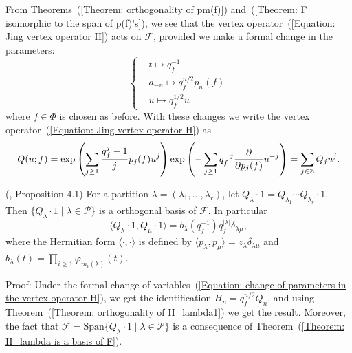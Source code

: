 From Theorems~(\ref{Theorem: orthogonality of pm(f)}) and~(\ref{Theorem: F isomorphic to the span of p(f)'s}), we see that the vertex operator~(\ref{Equation: Jing vertex operator H}) acts on $\mathcal{F}$, provided we make a formal change in the parameters:
\begin{equation}\label{Equation: change of parameters in the vertex operator H}
    \left\{\begin{aligned}
        &t\mapsto q_f^{-1}\\
        &a_{-n}\mapsto q_f^{n/2}p_n(f)\\
        &u\mapsto q_f^{1/2}u
    \end{aligned}\right.
\end{equation}
where $f\in\Phi$ is chosen as before. With these changes we write the vertex operator~(\ref{Equation: Jing vertex operator H}) as
\begin{equation}\label{Equation: vertex operator for Hall-Littlewood}
    Q(u;f) = \exp\left(\sum_{j\geq1}\frac{q_f^{j}-1}{j}p_j(f)u^j\right)\exp\left(-\sum_{j\geq1}q_f^{-j}\frac{\partial}{\partial p_j(f)}u^{-j}\right)=\sum_{j\in\mathbb{Z}}Q_ju^j.
\end{equation}
\begin{dang}
    \begin{theorem}(\cite{jing2024characters}, Proposition 4.1)\label{Theorem: orthogonality of Jing's Q_lambda}
        For a partition $\lambda=(\lambda_1,\dots,\lambda_r)$, let $Q_\lambda\cdot1 = Q_{\lambda_1}\cdots Q_{\lambda_r}\cdot1$. Then $\{Q_\lambda\cdot1\;|\;\lambda\in\mathcal{P}\}$ is a orthogonal basis of $\mathcal{F}$. In particular
        \begin{equation}
             \langle Q_\lambda\cdot1, Q_\mu\cdot1 \rangle = b_\lambda(q_f^{-1})q_f^{|\lambda|}\delta_{\lambda\mu},
        \end{equation}
        where the Hermitian form $\langle\cdot,\cdot\rangle$ is defined by $\langle p_\lambda,p_\mu\rangle=z_\lambda\delta_{\lambda\mu}$ and $b_\lambda(t)=\prod_{i\geq1}\varphi_{m_i(\lambda)}(t)$.
    \end{theorem}
\end{dang}
Proof: Under the formal change of variables~(\ref{Equation: change of parameters in the vertex operator H}), we get the identification $H_n=q_f^{n/2}Q_n$, and using Theorem~(\ref{Theorem: orthogonality of H_lambda1}) we get the result. Moreover, the fact that $\mathcal{F}=\text{Span}\{Q_\lambda\cdot1\;|\;\lambda\in\mathcal{P}\}$ is a consequence of Theorem~(\ref{Theorem: H_lambda is a basis of F}).
